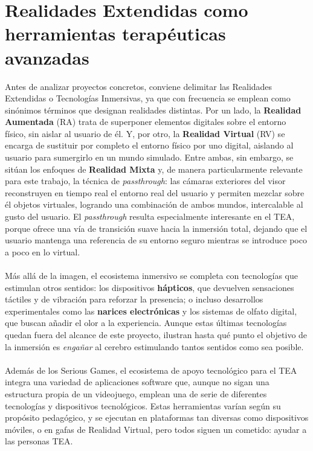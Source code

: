 \documentclass[12pt,twoside,titlepage]{report}
\begin{document}
\section{Realidades Extendidas como herramientas terapéuticas avanzadas}

Antes de analizar proyectos concretos, conviene delimitar las Realidades Extendidas o Tecnologías Inmersivas, ya que con frecuencia se emplean como sinónimos términos que designan realidades distintas.
Por un lado, la \textbf{Realidad Aumentada} (RA) trata de superponer elementos digitales sobre el entorno físico, sin aislar al usuario de él.
Y, por otro, la \textbf{Realidad Virtual} (RV) se encarga de sustituir por completo el entorno físico por uno digital, aislando al usuario para sumergirlo en un mundo simulado.
Entre ambas, sin embargo, se sitúan los enfoques de \textbf{Realidad Mixta} y, de manera particularmente relevante para este trabajo, la técnica de \textit{passthrough}: las cámaras exteriores del visor reconstruyen en tiempo real el entorno real del usuario y permiten mezclar sobre él objetos virtuales, logrando una combinación de ambos mundos, intercalable al gusto del usuario.
El \textit{passthrough} resulta especialmente interesante en el TEA, porque ofrece una vía de transición suave hacia la inmersión total, dejando que el usuario mantenga una referencia de su entorno seguro mientras se introduce poco a poco en lo virtual.\\
\\
Más allá de la imagen, el ecosistema inmersivo se completa con tecnologías que estimulan otros sentidos: los dispositivos \textbf{hápticos}, que devuelven sensaciones táctiles y de vibración para reforzar la presencia; o incluso desarrollos experimentales como las \textbf{narices electrónicas} y los sistemas de olfato digital, que buscan añadir el olor a la experiencia.
Aunque estas últimas tecnologías quedan fuera del alcance de este proyecto, ilustran hasta qué punto el objetivo de la inmersión es \textit{engañar} al cerebro estimulando tantos sentidos como sea posible.\\
\\
Además de los Serious Games, el ecosistema de apoyo tecnológico para el TEA integra una variedad de aplicaciones software que, aunque no sigan una estructura propia de un videojuego, emplean una de serie de diferentes tecnologías y dispositivos tecnológicos.
Estas herramientas varían según su propósito pedagógico, y se ejecutan en plataformas tan diversas como dispositivos móviles, o  en gafas de Realidad Virtual, pero todos siguen un cometido: ayudar a las personas TEA.
\end{document}
